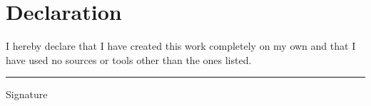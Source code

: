 \chapter*{Declaration}
I hereby declare that I have created this work completely on my own and that I have used no sources or tools other than the ones listed.

\vspace{1in}
\hrule
\bigskip
{}\hfill{\small{Signature}}

\cleardoublepage